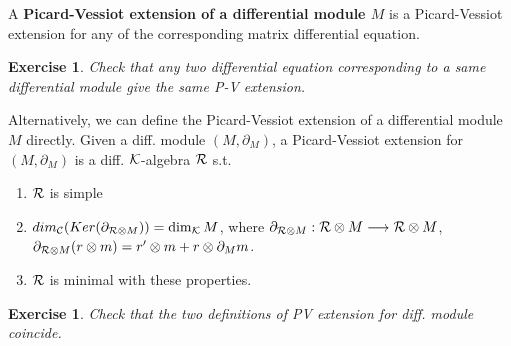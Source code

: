 \documentclass[11pt]{article}
\newtheorem{exercise}[thm]{Exercise}
\newcommand{\pd}{\partial}
\newcommand{\calc}{{\cal C}}
\newcommand{\calk}{{\cal K}}
\newcommand{\calr}{{\cal R}}
\newcommand{\lrta}{\longrightarrow}
\begin{document}
A \textbf{Picard-Vessiot extension of a differential module $M$} is a Picard-Vessiot extension for any of the corresponding matrix differential equation. 
\begin{exercise}
Check that any two differential equation corresponding to a same differential module give the same P-V extension.
\end{exercise}

Alternatively, we can define the Picard-Vessiot extension of a differential module $M$ directly. Given a diff. module $(M,\pd_M)$, a Picard-Vessiot extension for $(M,\pd_M)$ is a diff. $\calk$-algebra $\calr$ s.t.
\begin{enumerate}
\item $\calr$ is simple
\item $dim_\calc(Ker(\pd_{\calr\otimes M}))=\dim_\calk M$, where $\pd_{\calr\otimes M}:\calr\otimes M\lrta \calr\otimes M $, $\pd_{\calr\otimes M}(r\otimes m)=r'\otimes m+r\otimes \pd_M m$. 
\item $\calr$ is minimal with these properties.
\end{enumerate}
\begin{exercise} 
Check that the two definitions of PV extension for diff. module coincide.
\end{exercise}
\end{document}
